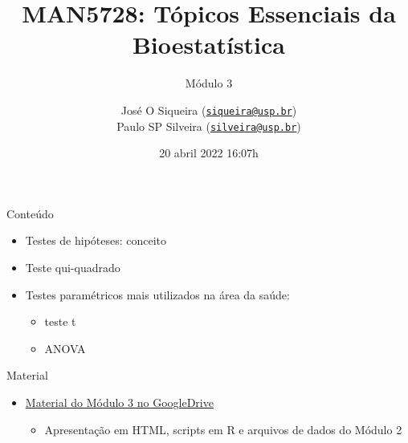 \documentclass[
  ignorenonframetext,
]{beamer}
\title{MAN5728: Tópicos Essenciais da Bioestatística}
\subtitle{Módulo 3}
\author{José O Siqueira
(\href{mailto:siqueira@usp.br}{\nolinkurl{siqueira@usp.br}})\\
Paulo SP Silveira
(\href{mailto:silveira@usp.br}{\nolinkurl{silveira@usp.br}})}
\date{20 abril 2022 16:07h}
\providecommand{\tightlist}{%
  \setlength{\itemsep}{0pt}\setlength{\parskip}{0pt}}
\begin{document}
\frame{\titlepage}

\begin{frame}{Conteúdo}
\protect\hypertarget{conteuxfado}{}
\begin{itemize}
\tightlist
\item
  Testes de hipóteses: conceito
\item
  Teste qui-quadrado
\item
  Testes paramétricos mais utilizados na área da saúde:

  \begin{itemize}
  \tightlist
  \item
    teste t
  \item
    ANOVA
  \end{itemize}
\end{itemize}
\end{frame}

\begin{frame}{Material}
\protect\hypertarget{material}{}
\begin{itemize}
\tightlist
\item
  \href{}{Material do Módulo 3 no GoogleDrive}

  \begin{itemize}
  \tightlist
  \item
    Apresentação em HTML, scripts em R e arquivos de dados do Módulo 2
  \end{itemize}
\end{itemize}
\end{frame}
\end{document}
